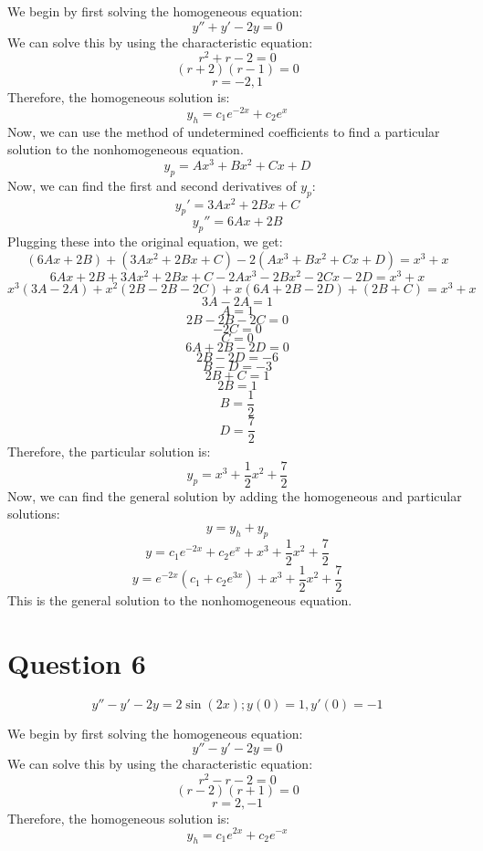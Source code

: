 \documentclass{article}
\begin{document}
We begin by first solving the homogeneous equation:
\[
y'' + y'  - 2y = 0
\]
We can solve this by using the characteristic equation:
\[
r^2 + r - 2 = 0
\]
\[
(r + 2)(r - 1) = 0
\]
\[
r = -2, 1
\]
Therefore, the homogeneous solution is:
\[
y_h = c_1e^{-2x} + c_2e^{x}
\]
Now, we can use the method of undetermined coefficients to find a particular solution to the nonhomogeneous equation. 
\[
y_p = Ax^{3} + Bx^{2} + Cx + D
\]
Now, we can find the first and second derivatives of $y_p$:
\[
y_p' = 3Ax^{2} + 2Bx + C
\]
\[
y_p'' = 6Ax + 2B
\]
Plugging these into the original equation, we get:
\[
(6Ax + 2B) + (3Ax^{2} + 2Bx + C) - 2(Ax^{3} + Bx^{2} + Cx + D) = x^{3} + x
\]
\[
6Ax + 2B + 3Ax^{2} + 2Bx + C - 2Ax^{3} - 2Bx^{2} - 2Cx - 2D = x^{3} + x
\]
\[
    x^{3}(3A - 2A) + x^{2}(2B - 2B - 2C) + x(6A + 2B - 2D) + (2B + C) = x^{3} + x
\]
\[
    3A - 2A = 1
\]
\[
    A = 1
\]
\[
    2B - 2B - 2C = 0
\]
\[
    -2C = 0
\]
\[
    C = 0
\]
\[
    6A + 2B - 2D = 0
\]
\[
    2B - 2D = -6
\]
\[
    B - D = -3
\]
\[
    2B + C = 1
\]
\[
    2B = 1
\]
\[
    B = \frac{1}{2}
\]
\[
    D = \frac{7}{2}
\]
Therefore, the particular solution is:
\[
y_p = x^{3} + \frac{1}{2}x^{2} + \frac{7}{2}
\]
Now, we can find the general solution by adding the homogeneous and particular solutions:
\[
y = y_h + y_p
\]
\[
y = c_1e^{-2x} + c_2e^{x} + x^{3} + \frac{1}{2}x^{2} + \frac{7}{2}
\]
\[
y = e^{-2x}(c_1 + c_2e^{3x}) + x^{3} + \frac{1}{2}x^{2} + \frac{7}{2}
\]
This is the general solution to the nonhomogeneous equation.

\section*{Question 6}
\[
y'' - y' - 2y = 2\sin(2x) ; y(0) = 1, y'(0) = -1
\]

We begin by first solving the homogeneous equation:
\[
y'' - y' - 2y = 0
\]
We can solve this by using the characteristic equation:
\[
r^2 - r - 2 = 0
\]
\[
(r - 2)(r + 1) = 0
\]
\[
r = 2, -1
\]
Therefore, the homogeneous solution is:
\[
y_h = c_1e^{2x} + c_2e^{-x}
\]
\end{document}

